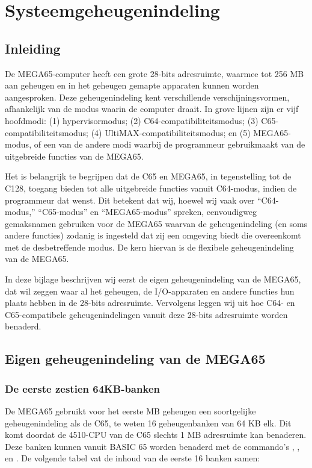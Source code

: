 \chapter{Systeemgeheugenindeling}
\label{cha:memory-map}
\section{Inleiding}

De MEGA65-computer heeft een grote 28-bits adresruimte, waarmee tot 256 MB aan geheugen en in het geheugen gemapte apparaten kunnen worden aangesproken. Deze geheugenindeling kent verschillende verschijningsvormen, afhankelijk van de modus waarin de computer draait. In grove lijnen zijn er vijf hoofdmodi: (1) hypervisormodus; (2) C64-compatibiliteitsmodus; (3) C65-compatibiliteitsmodus; (4) UltiMAX-compatibiliteitsmodus; en (5) MEGA65-modus, of een van de andere modi waarbij de programmeur gebruikmaakt van de uitgebreide functies van de MEGA65.

Het is belangrijk te begrijpen dat de C65 en MEGA65, in tegenstelling tot de C128, toegang bieden tot alle uitgebreide functies vanuit C64-modus, indien de programmeur dat wenst. Dit betekent dat wij, hoewel wij vaak over ``C64-modus,'' ``C65-modus'' en ``MEGA65-modus'' spreken, eenvoudigweg gemaksnamen gebruiken voor de MEGA65 waarvan de geheugenindeling (en soms andere functies) zodanig is ingesteld dat zij een omgeving biedt die overeenkomt met de desbetreffende modus. De kern hiervan is de flexibele geheugenindeling van de MEGA65.

In deze bijlage beschrijven wij eerst de eigen geheugenindeling van de MEGA65, dat wil zeggen waar al het geheugen, de I/O-apparaten en andere functies hun plaats hebben in de 28-bits adresruimte. Vervolgens leggen wij uit hoe C64- en C65-compatibele geheugenindelingen vanuit deze 28-bits adresruimte worden benaderd.

\newpage

\section{Eigen geheugenindeling van de MEGA65}

\subsection{De eerste zestien 64KB-banken}

De MEGA65 gebruikt voor het eerste MB geheugen een soortgelijke geheugenindeling als de C65, te weten 16 geheugenbanken van 64 KB elk. Dit komt doordat de 4510-CPU van de C65 slechts 1 MB adresruimte kan benaderen. Deze banken kunnen vanuit BASIC 65 worden benaderd met de commando's , ,  en . De volgende tabel vat de inhoud van de eerste 16 banken samen:

